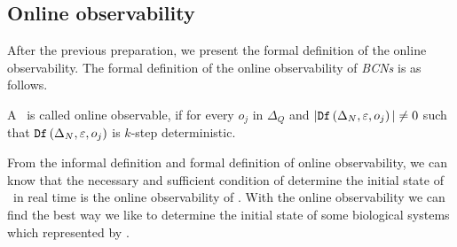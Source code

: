 \subsection{Online observability}
After the previous preparation, we present the formal definition of the online observability. The formal definition of the online observability of {\em BCNs} is as follows.
\begin{definition}
 A \BCN\ is called online observable,
if for every  $o_j$ in $\Delta_Q$ and $|{\tt Df}\left(\Delta_N,\varepsilon, o_j\right)|\neq 0$ such that ${\tt Df}\left(\Delta_N,\varepsilon,o_j\right)$ is $k$-step deterministic.
\end{definition}




From the informal definition and formal definition of online observability, we can know that the necessary and sufficient condition of determine the initial state of \BCNs\ in real time is the online observability of \BCNs. With the online observability we can find the best way we like to determine the initial state of some biological systems which represented by \BCNs.


